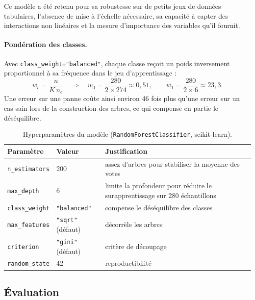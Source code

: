 \documentclass[11pt,a4paper]{article}
\newcommand{\code}[1]{\texttt{#1}}
\begin{document}
Ce modèle a été retenu pour sa robustesse sur de petits jeux de données tabulaires, l'absence
de mise à l'échelle nécessaire, sa capacité à capter des interactions non linéaires et la mesure
d'importance des variables qu'il fournit.

\paragraph{Pondération des classes.} Avec \code{class\_weight="balanced"}, chaque classe reçoit
un poids inversement proportionnel à sa fréquence dans le jeu d'apprentissage :
\begin{equation}
w_c = \frac{n}{K \, n_c}
\quad\Rightarrow\quad
w_0 = \frac{280}{2 \times 274} \approx 0{,}51, \qquad
w_1 = \frac{280}{2 \times 6} \approx 23{,}3 .
\end{equation}
Une erreur sur une panne coûte ainsi environ 46 fois plus qu'une erreur sur un cas sain lors de
la construction des arbres, ce qui compense en partie le déséquilibre.

\begin{table}[ht]
\centering\small
\caption{Hyperparamètres du modèle (\code{RandomForestClassifier}, scikit-learn).}
\label{tab:hyper}
\begin{tabularx}{\textwidth}{@{}l l X@{}}
\toprule
\textbf{Paramètre} & \textbf{Valeur} & \textbf{Justification} \\
\midrule
\code{n\_estimators} & 200 & assez d'arbres pour stabiliser la moyenne des votes \\
\code{max\_depth} & 6 & limite la profondeur pour réduire le surapprentissage sur 280 échantillons \\
\code{class\_weight} & \code{"balanced"} & compense le déséquilibre des classes \\
\code{max\_features} & \code{"sqrt"} (défaut) & décorrèle les arbres \\
\code{criterion} & \code{"gini"} (défaut) & critère de découpage \\
\code{random\_state} & 42 & reproductibilité \\
\bottomrule
\end{tabularx}
\end{table}

\subsection{Évaluation}
\end{document}
